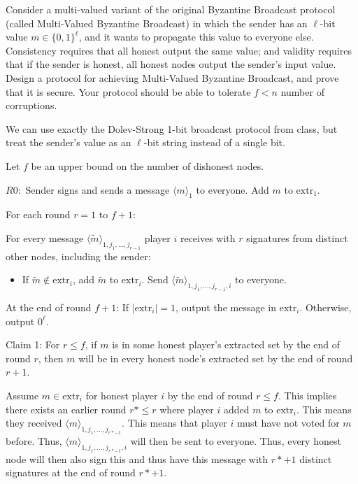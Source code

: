 \documentclass[12pt, letterpaper]{article}
\begin{document}
\begin{problem}{}
    Consider a multi-valued variant of the original Byzantine Broadcast protocol (called Multi-Valued Byzantine Broadcast) in which the sender has an $\ell$-bit value $m \in \{0, 1\}^\ell$, and it wants to propagate this value to everyone else. Consistency requires that all honest output the same value; and validity requires that if the sender is honest, all honest nodes output the sender's input value.
    Design a protocol for achieving Multi-Valued Byzantine Broadcast, and prove that it is secure. Your protocol should be able to tolerate $f < n$ number of corruptions.
\end{problem}
\begin{problemproof}
    We can use exactly the Dolev-Strong 1-bit broadcast protocol from class, but treat the sender's value as an $\ell$-bit string instead of a single bit.

    Let $f$ be an upper bound on the number of dishonest nodes.

    $R0:$ Sender signs and sends a message $\langle m \rangle_1$ to everyone. Add $m$ to $\mathrm{extr}_1$.

    For each round $r=1$ to $f+1$:

    For every message $\langle \tilde{m} \rangle_{1,j_1,\dots,j_{r-1}}$ player $i$ receives with $r$ signatures from distinct other nodes, including the sender:
    \begin{itemize}
        \item If $\tilde{m} \notin \mathrm{extr}_i$, add $\tilde{m}$ to $\mathrm{extr}_i$. Send $\langle \tilde{m} \rangle_{1,j_1,\dots,j_{r-1}, i}$ to everyone.
    \end{itemize}
    At the end of round $f+1$: If $|\mathrm{extr}_i| = 1$, output the message in $\mathrm{extr}_i$. Otherwise, output $0^{\ell}$.

    Claim 1: For $r \leq f$, if $m$ is in some honest player's extracted set by the end of round $r$, then $m$ will be in every honest node's extracted set by the end of round $r+1$.

    Assume $m \in \mathrm{extr}_i$ for honest player $i$ by the end of round $r \leq f$. This implies there exists
    an earlier round $r* \leq r$ where player $i$ added $m$ to $\mathrm{extr}_i$. This means they received $\langle m \rangle_{1,j_1,\dots,j_{r*-1}}$. This means that player $i$ must have not voted for $m$ before.
    Thus, $\langle m \rangle_{1,j_1,\dots,j_{r*-1},i}$ will then be sent to everyone. Thus, every honest node will then also sign this and thus have this message with $r*+1$ distinct signatures at the end of round $r*+1$.


\end{problemproof}
\end{document}
